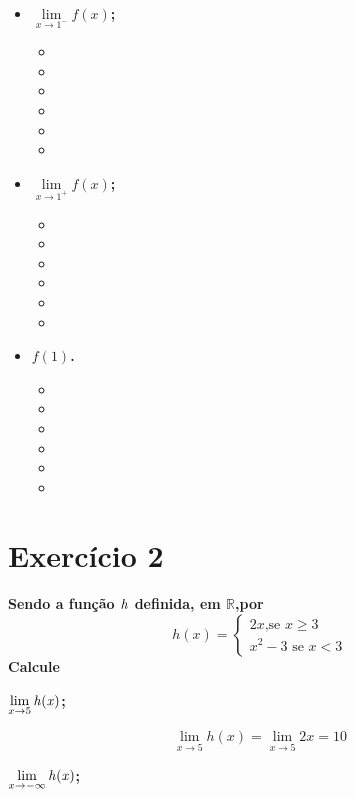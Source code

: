 \documentclass[a4paper]{article}
\begin{document}
\begin{itemize}
	\item[i)]\textbf{$\lim\limits_{x \to 1^-}f(x)$;}
	\begin{itemize}
		\item[a)]
		\item[b)]
		\item[c)]
		\item[d)]
		\item[e)]\text{$+\infty$;}
		\item[f)]\text{$+\infty$;}
	\end{itemize}
	\item[ii)]\textbf{$\lim\limits_{x \to 1^+}f(x)$;}
		\begin{itemize}
		\item[a)]
		\item[b)]
		\item[c)]
		\item[d)]
		\item[e)]\text{$-\infty$;}
		\item[f)]\text{$+\infty$;}
	\end{itemize}
	\item[iii)]\textbf{$f(1)$.}
		\begin{itemize}
		\item[a)]
		\item[b)]
		\item[c)]
		\item[d)]
		\item[e)]
		\item[f)]
	\end{itemize}
\end{itemize}
\section*{Exercício 2}\textbf{Sendo a função $\it{h}$ definida, em $\mathbb{R}$,por}
\[h(x)=\begin{cases}
	\text{$2x$,se $x \geq 3$}\\ 
	\text{$x^2-3$ se $x < 3$}
\end{cases}\]
\textbf{Calcule}

\textbf{$\lim\limits_{x \to 5} \it{h(x)}$;}

\[\lim\limits_{x \to 5} h(x)=\lim\limits_{x \to 5} 2x = 10\]

\textbf{$\lim\limits_{x \to -\infty} \it{h(x)}$;}
\end{document}
